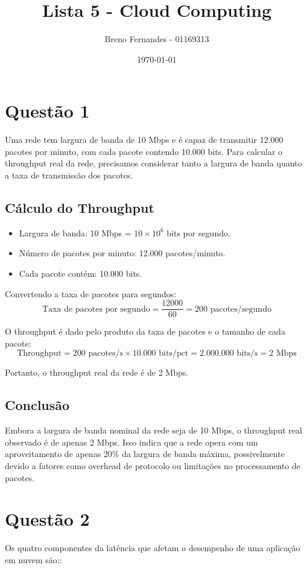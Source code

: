 \documentclass[a4paper,12pt]{article}
\title{Lista 5 - Cloud Computing}
\author{Breno Fernandes - 01169313}
\date{\today}
\begin{document}
\maketitle

\section*{Questão 1}
Uma rede tem largura de banda de 10 Mbps e é capaz de transmitir 12.000 pacotes por minuto, com cada pacote contendo 10.000 bits. Para calcular o throughput real da rede, precisamos considerar tanto a largura de banda quanto a taxa de transmissão dos pacotes.

\subsection*{Cálculo do Throughput}
\begin{itemize}
    \item Largura de banda: 10 Mbps = \( 10 \times 10^6 \) bits por segundo.
    \item Número de pacotes por minuto: 12.000 pacotes/minuto.
    \item Cada pacote contém: 10.000 bits.
\end{itemize}

Convertendo a taxa de pacotes para segundos:
\[
\text{Taxa de pacotes por segundo} = \frac{12000}{60} = 200 \text{ pacotes/segundo}
\]

O throughput é dado pelo produto da taxa de pacotes e o tamanho de cada pacote:
\[
\text{Throughput} = 200 \text{ pacotes/s} \times 10.000 \text{ bits/pct} = 2.000.000 \text{ bits/s} = 2 \text{ Mbps}
\]

Portanto, o throughput real da rede é de 2 Mbps.

\subsection*{Conclusão}
Embora a largura de banda nominal da rede seja de 10 Mbps, o throughput real observado é de apenas 2 Mbps. Isso indica que a rede opera com um aproveitamento de apenas 20\% da largura de banda máxima, possivelmente devido a fatores como overhead de protocolo ou limitações no processamento de pacotes.

\section*{Questão 2}
Os quatro componentes da latência que afetam o desempenho de uma aplicação em nuvem são::
\end{document}
